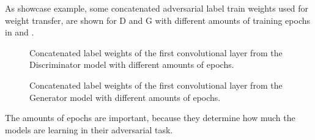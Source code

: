 As showcase example, some concatenated adversarial label train weights used for weight transfer, are shown for D and G with different amounts of training epochs in  and .
\begin{figure}[!ht]
  \centering
  \caption{Concatenated label weights of the first convolutional layer from the Discriminator model with different amounts of epochs.}
  \label{fig:nn_adv_label_weights_d}
\end{figure}
\FloatBarrier
\noindent
\begin{figure}[!ht]
  \centering
  \caption{Concatenated label weights of the first convolutional layer from the Generator model with different amounts of epochs.}
  \label{fig:nn_adv_label_weights_g}
\end{figure}
\FloatBarrier
\noindent
The amounts of epochs are important, because they determine how much the models are learning in their adversarial task.
